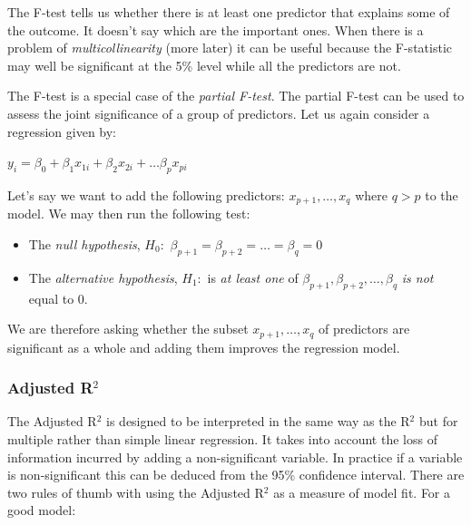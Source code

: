 \documentclass[
]{gitbook}
\providecommand{\tightlist}{%
  \setlength{\itemsep}{0pt}\setlength{\parskip}{0pt}}
\begin{document}
The F-test tells us whether there is at least one predictor that explains some of the outcome. It doesn't say which are the important ones. When there is a problem of \emph{multicollinearity} (more later) it can be useful because the F-statistic may well be significant at the 5\% level while all the predictors are not.


The F-test is a special case of the \emph{partial F-test}. The partial F-test can be used to assess the joint significance of a group of predictors. Let us again consider a regression given by:

\(y_i = \beta_0+ \beta_1 x_{1i} + \beta_2 x_{2i} + \ldots \beta_p x_{pi}\)

Let's say we want to add the following predictors: \(x_{p+1},\ldots,x_q\) where \(q > p\) to the model. We may then run the following test:

\begin{itemize}
\tightlist
\item
  The \emph{null hypothesis}, \(H_0: \,\, \beta_{p+1}=\beta_{p+2}= \ldots =\beta_q=0\)
\item
  The \emph{alternative hypothesis}, \(H_1:\) is \emph{at least one} of \(\beta_{p+1},\beta_{p+2}, \ldots ,\beta_q\) \emph{is not} equal to 0.
\end{itemize}

We are therefore asking whether the subset \(x_{p+1},\ldots,x_q\) of predictors are significant as a whole and adding them improves the regression model.

\hypertarget{adjusted-r2}{%
\subsubsection{\texorpdfstring{Adjusted R\(^2\)}{Adjusted R\^{}2}}\label{adjusted-r2}}

The Adjusted R\(^2\) is designed to be interpreted in the same way as the R\(^2\) but for multiple rather than simple linear regression. It takes into account the loss of information incurred by adding a non-significant variable. In practice if a variable is non-significant this can be deduced from the 95\% confidence interval. There are two rules of thumb with using the Adjusted R\(^2\) as a measure of model fit. For a good model:
\end{document}
